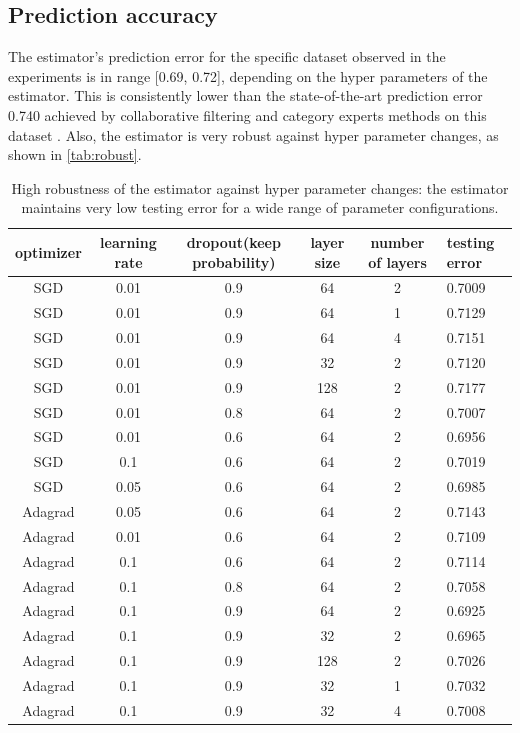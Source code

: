 \documentclass{article}
\begin{document}
\subsection{Prediction accuracy}
The estimator's prediction error for the specific dataset observed in the 
experiments is in range [0.69, 0.72], depending on the hyper parameters of the 
estimator.
This is consistently lower than the state-of-the-art prediction error 0.740 
achieved by collaborative filtering and category experts methods on this 
dataset \cite{hwang2016efficient}.
Also, the estimator is very robust against hyper parameter changes, as shown in 
\autoref{tab:robust}.
\begin{table}[h]
	\centering
	\begin{tabularx}{\textwidth}{ |c|c|c|c|c|X| } \hline
		optimizer  & learning rate & dropout(keep probability) & layer size & 
		number of layers & 
		testing error \\ \hline
		SGD & 0.01 & 0.9 & 64 & 2 & 0.7009 \\ \hline
		SGD & 0.01 & 0.9 & 64 & 1 & 0.7129 \\ \hline
		SGD & 0.01 & 0.9 & 64 & 4 & 0.7151 \\ \hline
		SGD & 0.01 & 0.9 & 32 & 2 & 0.7120 \\ \hline
		SGD & 0.01 & 0.9 & 128 & 2 & 0.7177 \\ \hline
		SGD & 0.01 & 0.8 & 64 & 2 & 0.7007 \\ \hline
		SGD & 0.01 & 0.6 & 64 & 2 & 0.6956 \\ \hline
		SGD & 0.1 & 0.6 & 64 & 2 & 0.7019 \\ \hline
		SGD & 0.05 & 0.6 & 64 & 2 & 0.6985 \\ \hline
		Adagrad & 0.05 & 0.6 & 64 & 2 & 0.7143 \\ \hline
		Adagrad & 0.01 & 0.6 & 64 & 2 & 0.7109 \\ \hline
		Adagrad & 0.1 & 0.6 & 64 & 2 & 0.7114 \\ \hline
		Adagrad & 0.1 & 0.8 & 64 & 2 & 0.7058 \\ \hline
		Adagrad & 0.1 & 0.9 & 64 & 2 & 0.6925 \\ \hline
		Adagrad & 0.1 & 0.9 & 32 & 2 & 0.6965 \\ \hline
		Adagrad & 0.1 & 0.9 & 128 & 2 & 0.7026 \\ \hline
		Adagrad & 0.1 & 0.9 & 32 & 1 & 0.7032 \\ \hline
		Adagrad & 0.1 & 0.9 & 32 & 4 & 0.7008 \\ \hline
	\end{tabularx}
	\caption{High robustness of the estimator against hyper parameter changes: 
	the estimator maintains very low testing error for a wide range of 
	parameter configurations.}
	\label{tab:robust}
\end{table}
\end{document}
